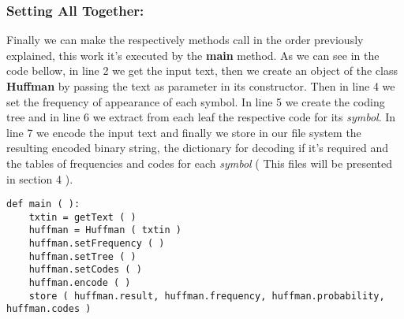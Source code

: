 \subsubsection{Setting All Together:}

Finally we can make the respectively methods call in the order previously explained, this work it's executed by the {\bfseries main} method. As we can see in the code bellow, in line 2 we get the input text, then we create an object of the class {\bfseries Huffman} by passing the text as parameter in its constructor. Then in line 4 we set the frequency of appearance of each symbol. In line 5 we create the coding tree and in line 6 we extract from each leaf the respective code for its {\itshape symbol}. In line 7 we encode the input text and finally we store in our file system the resulting encoded binary string, the dictionary for decoding if it's required and the tables of frequencies and codes for each {\itshape symbol} ( This files will be presented in section 4 ). \hfill \break

\begin{lstlisting}
def main ( ):
    txtin = getText ( )
    huffman = Huffman ( txtin )
    huffman.setFrequency ( )
    huffman.setTree ( )
    huffman.setCodes ( )
    huffman.encode ( )
    store ( huffman.result, huffman.frequency, huffman.probability, huffman.codes )
\end{lstlisting}

\pagebreak